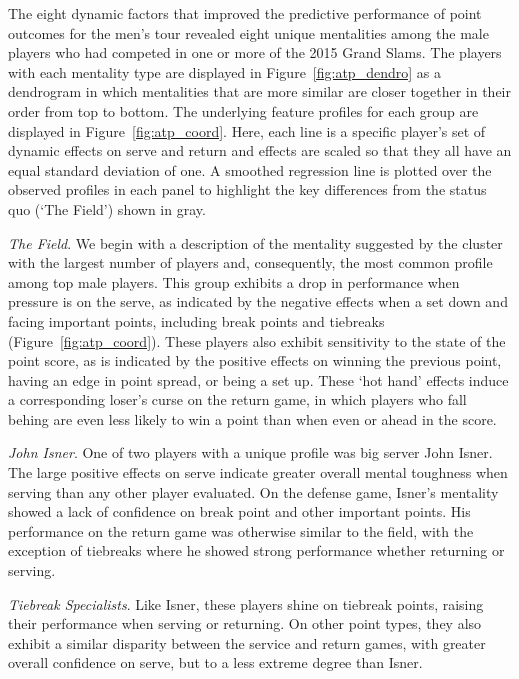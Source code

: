 \documentclass{Latex/svjour3}
\begin{document}
The eight dynamic factors that improved the predictive performance of
point outcomes for the men's tour revealed eight unique mentalities
among the male players who had competed in one or more of the 2015
Grand Slams. The players with each mentality type are displayed in
Figure~\ref{fig:atp_dendro} as a dendrogram in which mentalities that
are more similar are closer together in their order from top to
bottom. The underlying feature profiles for each group are displayed in
Figure~\ref{fig:atp_coord}. Here, each line is a specific player's
set of dynamic effects on serve and return and effects are scaled so
that they all have an equal standard deviation of one. A smoothed
regression line is plotted over the observed profiles in each panel to
highlight the key differences from the status quo (`The Field') shown
in gray.

\textit{The Field}. We begin with a description of the mentality
suggested by the cluster with the largest number of players and,
consequently, the most common profile among top male players. This
group exhibits a drop in performance when pressure is on the serve, as
indicated by the negative effects when a set down and facing important
points, including break points and tiebreaks (Figure~\ref{fig:atp_coord}). These players also
exhibit sensitivity to the state of the point score, as is indicated
by the positive effects on winning the previous point, having an edge
in point spread, or being a set up. These `hot hand' effects induce a
corresponding loser's curse on the return game, in which players who
fall behing are even less likely to win a point than when even or
ahead in the score. 

\textit{John Isner}. One of two players with a unique profile was big
server John Isner. The large positive effects on serve indicate
greater overall mental toughness when serving than any other player
evaluated. On the defense game, Isner's mentality showed a lack of
confidence on break point and other important points. His performance
on the return game was otherwise similar to the field, with the
exception of tiebreaks where he showed strong performance whether
returning or serving. 

\textit{Tiebreak Specialists}. Like Isner, these players shine on
tiebreak points, raising their performance when serving or
returning. On other point types, they also exhibit a similar disparity
between the service and return games, with greater overall confidence
on serve, but to a less extreme degree than Isner.
\end{document}
